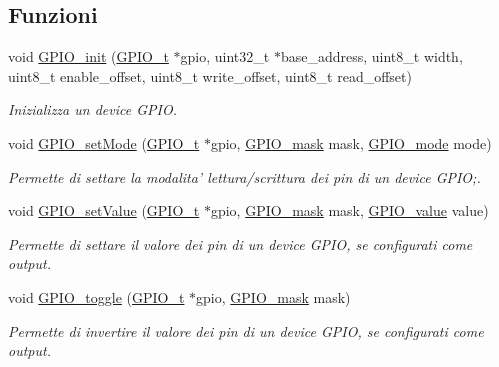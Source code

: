 \subsection*{Funzioni}
\begin{DoxyCompactItemize}
\item 
void \hyperlink{group___g_p_i_o_gad3d8f07163fbe858774e769eb6d755db}{G\+P\+I\+O\+\_\+init} (\hyperlink{struct_g_p_i_o__t}{G\+P\+I\+O\+\_\+t} $\ast$gpio, uint32\+\_\+t $\ast$base\+\_\+address, uint8\+\_\+t width, uint8\+\_\+t enable\+\_\+offset, uint8\+\_\+t write\+\_\+offset, uint8\+\_\+t read\+\_\+offset)
\begin{DoxyCompactList}\small\item\em Inizializza un device G\+P\+I\+O. \end{DoxyCompactList}\item 
void \hyperlink{group___g_p_i_o_ga3f18ccfbb70d89cc7e2b06712dd82eb7}{G\+P\+I\+O\+\_\+set\+Mode} (\hyperlink{struct_g_p_i_o__t}{G\+P\+I\+O\+\_\+t} $\ast$gpio, \hyperlink{group___g_p_i_o_ga6d5aef8a8a54ee2f602d47252ff66595}{G\+P\+I\+O\+\_\+mask} mask, \hyperlink{group___g_p_i_o_ga894e6ae857ed4a9aedd04fff44a6770e}{G\+P\+I\+O\+\_\+mode} mode)
\begin{DoxyCompactList}\small\item\em Permette di settare la modalita' lettura/scrittura dei pin di un device G\+P\+I\+O;. \end{DoxyCompactList}\item 
void \hyperlink{group___g_p_i_o_ga86b232ed74eacf9aa723cb1d7917a156}{G\+P\+I\+O\+\_\+set\+Value} (\hyperlink{struct_g_p_i_o__t}{G\+P\+I\+O\+\_\+t} $\ast$gpio, \hyperlink{group___g_p_i_o_ga6d5aef8a8a54ee2f602d47252ff66595}{G\+P\+I\+O\+\_\+mask} mask, \hyperlink{group___g_p_i_o_ga495d9a7aa735fe416a3f110337c54967}{G\+P\+I\+O\+\_\+value} value)
\begin{DoxyCompactList}\small\item\em Permette di settare il valore dei pin di un device G\+P\+I\+O, se configurati come output. \end{DoxyCompactList}\item 
void \hyperlink{group___g_p_i_o_ga2f516854e98cd048d4d1ee6f86261f8c}{G\+P\+I\+O\+\_\+toggle} (\hyperlink{struct_g_p_i_o__t}{G\+P\+I\+O\+\_\+t} $\ast$gpio, \hyperlink{group___g_p_i_o_ga6d5aef8a8a54ee2f602d47252ff66595}{G\+P\+I\+O\+\_\+mask} mask)
\begin{DoxyCompactList}\small\item\em Permette di invertire il valore dei pin di un device G\+P\+I\+O, se configurati come output. \end{DoxyCompactList}\item 

\end{DoxyCompactItemize}
